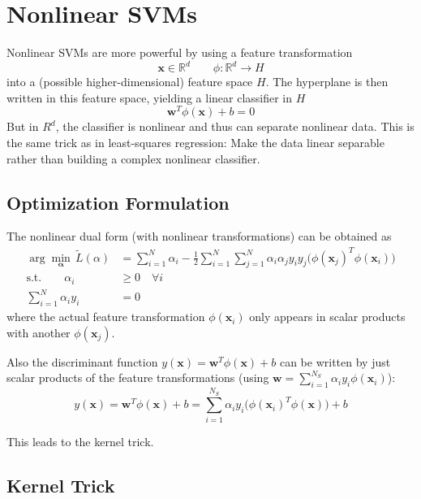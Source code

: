 \documentclass[a4paper, 11pt, accentcolor = tud3b]{tudreport}
\newcommand{\R}{\ensuremath{\mathbb{R}}}
\renewcommand{\vec}[1]{\mathbf{#1}}
\begin{document}
		\section{Nonlinear SVMs}
			Nonlinear SVMs are more powerful by using a feature transformation
			\begin{equation}
				\vec{x} \in \R^d \qquad \phi : \R^d \rightarrow H
			\end{equation}
			into a (possible higher-dimensional) feature space \(H\). The hyperplane is then written in this feature space, yielding a linear classifier in \(H\)
			\begin{equation}
				\vec{w}^T \phi(\vec{x}) + b = 0
			\end{equation}
			But in \(R^d\), the classifier is nonlinear and thus can separate nonlinear data. This is the same trick as in least-squares regression: Make the data linear separable rather than building a complex nonlinear classifier.

			\subsection{Optimization Formulation}
				The nonlinear dual form (with nonlinear transformations) can be obtained as
				\begin{align}
					\arg\min_{ \vec{\alpha} } \, \tilde{L}(\alpha) &= \sum_{i = 1}^{N} \alpha_i - \frac{1}{2} \sum_{i = 1}^{N} \sum_{j = 1}^{N} \alpha_i \alpha_j y_i y_j \big(\phi(\vec{x}_j)^T \phi(\vec{x}_i)\big) \\
					\textrm{s.t.} \qquad
					\alpha_i &\geq 0 \quad\forall i \\
					\sum_{i = 1}^{N} \alpha_i y_i &= 0
				\end{align}
				where the actual feature transformation \( \phi(\vec{x}_i) \) only appears in scalar products with another \( \phi(\vec{x}_j) \).
				
				Also the discriminant function \( y(\vec{x}) = \vec{w}^T \phi(\vec{x}) + b \) can be written by just scalar products of the feature transformations (using \( \vec{w} = \sum_{i = 1}^{N_S} \alpha_i y_i \phi(\vec{x}_i) \)):
				\begin{equation}
					y(\vec{x}) = \vec{w}^T \phi(\vec{x}) + b = \sum_{i = 1}^{N_S} \alpha_i y_i \big(\phi(\vec{x}_i)^T \phi(\vec{x})\big) + b
				\end{equation}
				
				This leads to the kernel trick.

			\subsection{Kernel Trick}
				\label{sec:svmKernelTrick}
			
\end{document}
